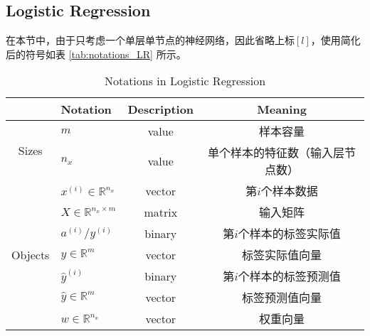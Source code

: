 \subsection{Logistic Regression}

在本节中，由于只考虑一个单层单节点的神经网络，因此省略上标$[l]$，使用简化后的符号如表 \ref{tab:notations_LR} 所示。

\begin{table}[ht]
	\centering
	\begin{threeparttable}
	\caption{Notations in Logistic Regression}
	\begin{tabular}{clcc}
		\hline
									& \textbf{Notation}                         & \textbf{Description} & \textbf{Meaning}                                                   \\ \hline
		\multirow{2}{*}{Sizes}      & $m$                                       & value                & 样本容量                                                               \\
									& $n_x$                                     & value                & 单个样本的特征数（输入层节点数）                                         \\ \hline
		\multirow{8}{*}{Objects}    & $x^{(i)} \in \mathbb{R}^{n_x}$            & vector               & 第$i$个样本数据                                                          \\
									& $X \in {\mathbb{R}^{n_x \times m}}$       & matrix               & 输入矩阵                                                               \\
									& $a^{(i)} / y^{(i)}$                       & binary               & 第$i$个样本的标签实际值                                                        \\
									& $y \in \mathbb{R}^{m}$					& vector               & 标签实际值向量                                                          \\
									& $\hat{y}^{(i)}$                           & binary               & 第$i$个样本的标签预测值                                                  \\
									& $\hat{y} \in {\mathbb{R}^{m}}$            & vector               & 标签预测值向量   					                                     \\
									& $w \in \mathbb{R}^{n_x}$                  & vector               & 权重向量                                                                \\

\end{tabular}
\end{threeparttable}
\end{table}
